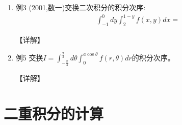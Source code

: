 \documentclass[12pt, a4paper, oneside, UTF8]{ctexbook}
\begin{document}
\begin{enumerate}[label=\arabic*.,start=3]
    \item 例3 (2001,数一)交换二次积分的积分次序:
    \begin{align*}
        \int_{-1}^0 dy\int_2^{1-y} f(x,y)dx=
    \end{align*}
    
    \begin{solution}
    【详解】
    \end{solution}
    
    \item 例5 交换$I=\int_{-\frac{\pi}{4}}^{\frac{\pi}{2}}d\theta\int_0^{a\cos\theta}f(r,\theta)dr$的积分次序。
    
    \begin{solution}
    【详解】
    \end{solution}
\end{enumerate}

\section{二重积分的计算}
\end{document}
